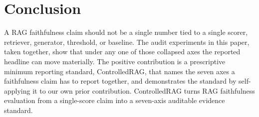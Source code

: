 \section{Conclusion}
\label{sec:conclusion}

A RAG faithfulness claim should not be a single number tied to a single
scorer, retriever, generator, threshold, or baseline. The audit
experiments in this paper, taken together, show that under any one of
those collapsed axes the reported headline can move materially.
The positive contribution is a prescriptive minimum reporting standard,
ControlledRAG, that names the seven axes a faithfulness claim has to
report together, and demonstrates the standard by self-applying it to
our own prior contribution. ControlledRAG turns RAG faithfulness
evaluation from a single-score claim into a seven-axis auditable
evidence standard.
